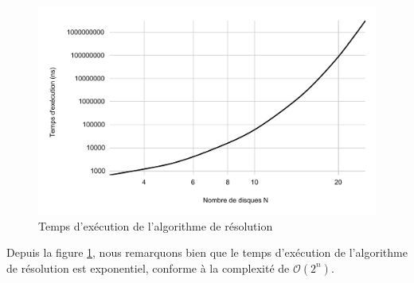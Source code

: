 \begin{figure}[H]
    \centering
        \includegraphics[scale=0.6]{./ressources/temps_execution_algo_reso.pdf}
        \caption{Temps d'exécution de l'algorithme de résolution}
    \label{fig:temps_exec_algo_reso}
\end{figure}
\par
Depuis la figure \ref{fig:temps_exec_algo_reso}, nous remarquons bien que le temps d'exécution de l'algorithme de résolution est exponentiel, conforme à la complexité de $\mathcal{O}(2^{n})$.

